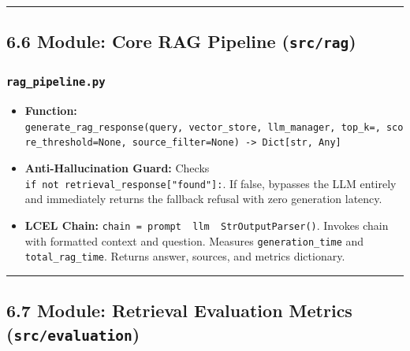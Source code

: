\documentclass[
]{article}
\providecommand{\tightlist}{%
  \setlength{\itemsep}{0pt}\setlength{\parskip}{0pt}}
\begin{document}
\begin{center}\rule{0.5\linewidth}{0.5pt}\end{center}

\subsection{\texorpdfstring{6.6 Module: Core RAG Pipeline
(\texttt{src/\allowbreak rag})}{6.6 Module: Core RAG Pipeline (src/rag)}}\label{module-core-rag-pipeline-srcrag}

\subsubsection{\texorpdfstring{\texttt{rag\_\allowbreak pipeline.\allowbreak py}}{rag\_pipeline.py}}\label{rag_pipeline.py}

\begin{itemize}
\tightlist
\item
  \textbf{Function:}
  \texttt{generate\_\allowbreak rag\_\allowbreak response(\allowbreak query,\allowbreak \ \allowbreak vector\_\allowbreak store,\allowbreak \ \allowbreak llm\_\allowbreak manager,\allowbreak \ \allowbreak top\_\allowbreak k=,\allowbreak \ \allowbreak score\_\allowbreak threshold=\allowbreak None,\allowbreak \ \allowbreak source\_\allowbreak filter=\allowbreak None)\allowbreak \ \allowbreak -\textgreater{}\allowbreak \ \allowbreak Dict{[}str,\allowbreak \ \allowbreak Any{]}}
\item
  \textbf{Anti-Hallucination Guard:} Checks
  \texttt{if\ \allowbreak not\ \allowbreak retrieval\_\allowbreak response{[}"found"{]}:}. If false,
  bypasses the LLM entirely and immediately returns the fallback refusal
  with zero generation latency.
\item
  \textbf{LCEL Chain:}
  \texttt{chain\ \allowbreak =\allowbreak \ \allowbreak prompt\ \allowbreak \textbar{}\ \allowbreak llm\ \allowbreak \textbar{}\ \allowbreak StrOutputParser(\allowbreak )\allowbreak }.
  Invokes chain with formatted context and question. Measures
  \texttt{generation\_\allowbreak time} and \texttt{total\_\allowbreak rag\_\allowbreak time}. Returns
  answer, sources, and metrics dictionary.
\end{itemize}

\begin{center}\rule{0.5\linewidth}{0.5pt}\end{center}

\subsection{\texorpdfstring{6.7 Module: Retrieval Evaluation Metrics
(\texttt{src/\allowbreak evaluation})}{6.7 Module: Retrieval Evaluation Metrics (src/evaluation)}}\label{module-retrieval-evaluation-metrics-srcevaluation}
\end{document}
